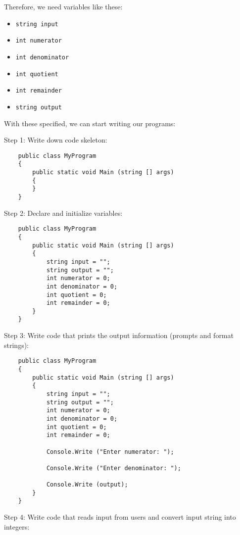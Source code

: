 \documentclass[../main.tex]{subfiles}
\begin{document}
Therefore, we need variables like these:
\begin{itemize}
    \item \texttt{string input}
    \item \texttt{int numerator}
    \item \texttt{int denominator}
    \item \texttt{int quotient}
    \item \texttt{int remainder}
    \item \texttt{string output}
\end{itemize}

With these specified, we can start writing our programs:

Step 1: Write down code skeleton:

\begin{verbatim}
    public class MyProgram
    {
        public static void Main (string [] args)
        {
        }
    }
\end{verbatim}

Step 2: Declare and initialize variables:

\begin{verbatim}
    public class MyProgram
    {
        public static void Main (string [] args)
        {
            string input = "";
            string output = "";
            int numerator = 0;
            int denominator = 0;
            int quotient = 0;
            int remainder = 0;
        }
    }
\end{verbatim}

Step 3: Write code that prints the output information (prompts and format strings):

\begin{verbatim}
    public class MyProgram
    {
        public static void Main (string [] args)
        {
            string input = "";
            string output = "";
            int numerator = 0;
            int denominator = 0;
            int quotient = 0;
            int remainder = 0;

            Console.Write ("Enter numerator: ");

            Console.Write ("Enter denominator: ");

            Console.Write (output);
        }
    }
\end{verbatim}

Step 4: Write code that reads input from users and convert input string into integers:
\end{document}

